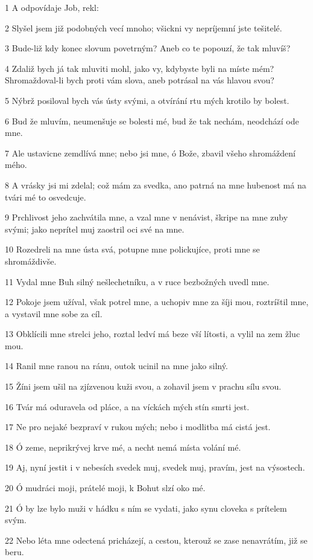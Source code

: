 \par 1 A odpovídaje Job, rekl:
\par 2 Slyšel jsem již podobných vecí mnoho; všickni vy nepríjemní jste tešitelé.
\par 3 Bude-liž kdy konec slovum povetrným? Aneb co te popouzí, že tak mluvíš?
\par 4 Zdaliž bych já tak mluviti mohl, jako vy, kdybyste byli na míste mém? Shromaždoval-li bych proti vám slova, aneb potrásal na vás hlavou svou?
\par 5 Nýbrž posiloval bych vás ústy svými, a otvírání rtu mých krotilo by bolest.
\par 6 Bud že mluvím, neumenšuje se bolesti mé, bud že tak nechám, neodchází ode mne.
\par 7 Ale ustavicne zemdlívá mne; nebo jsi mne, ó Bože, zbavil všeho shromáždení mého.
\par 8 A vrásky jsi mi zdelal; což mám za svedka, ano patrná na mne hubenost má na tvári mé to osvedcuje.
\par 9 Prchlivost jeho zachvátila mne, a vzal mne v nenávist, škripe na mne zuby svými; jako neprítel muj zaostril oci své na mne.
\par 10 Rozedreli na mne ústa svá, potupne mne polickujíce, proti mne se shromáždivše.
\par 11 Vydal mne Buh silný nešlechetníku, a v ruce bezbožných uvedl mne.
\par 12 Pokoje jsem užíval, však potrel mne, a uchopiv mne za šíji mou, roztríštil mne, a vystavil mne sobe za cíl.
\par 13 Obklícili mne strelci jeho, roztal ledví má beze vší lítosti, a vylil na zem žluc mou.
\par 14 Ranil mne ranou na ránu, outok ucinil na mne jako silný.
\par 15 Žíni jsem ušil na zjízvenou kuži svou, a zohavil jsem v prachu sílu svou.
\par 16 Tvár má oduravela od pláce, a na víckách mých stín smrti jest.
\par 17 Ne pro nejaké bezpraví v rukou mých; nebo i modlitba má cistá jest.
\par 18 Ó zeme, neprikrývej krve mé, a necht nemá místa volání mé.
\par 19 Aj, nyní jestit i v nebesích svedek muj, svedek muj, pravím, jest na výsostech.
\par 20 Ó mudráci moji, prátelé moji, k Bohut slzí oko mé.
\par 21 Ó by lze bylo muži v hádku s ním se vydati, jako synu cloveka s prítelem svým.
\par 22 Nebo léta mne odectená pricházejí, a cestou, kterouž se zase nenavrátím, již se beru.

